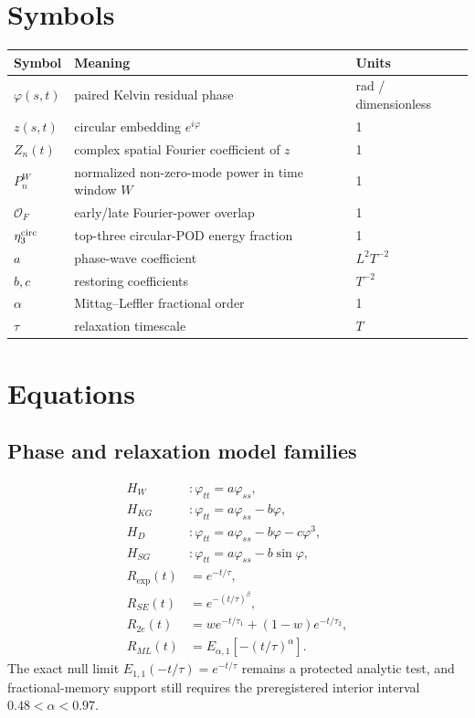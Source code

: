 \documentclass[11pt,a4paper]{article}
\begin{document}
\section{Symbols}
\begin{longtable}{lll}\toprule Symbol & Meaning & Units\\\midrule
$\varphi(s,t)$ & paired Kelvin residual phase & rad / dimensionless\\
$z(s,t)$ & circular embedding $e^{i\varphi}$ & 1\\
$Z_n(t)$ & complex spatial Fourier coefficient of $z$ & 1\\
$P_n^W$ & normalized non-zero-mode power in time window $W$ & 1\\
$\mathcal O_F$ & early/late Fourier-power overlap & 1\\
$\eta_3^{\rm circ}$ & top-three circular-POD energy fraction & 1\\
$a$ & phase-wave coefficient & $L^2T^{-2}$\\
$b,c$ & restoring coefficients & $T^{-2}$\\
$\alpha$ & Mittag--Leffler fractional order & 1\\
$\tau$ & relaxation timescale & $T$\\\bottomrule\end{longtable}

\section{Equations}
\subsection{Phase and relaxation model families}
\begin{align}
H_W &: \varphi_{tt}=a\varphi_{ss},\\
H_{KG} &: \varphi_{tt}=a\varphi_{ss}-b\varphi,\\
H_D &: \varphi_{tt}=a\varphi_{ss}-b\varphi-c\varphi^3,\\
H_{SG} &: \varphi_{tt}=a\varphi_{ss}-b\sin\varphi,\\
R_{\exp}(t)&=e^{-t/\tau},\\
R_{SE}(t)&=e^{-(t/\tau)^\beta},\\
R_{2e}(t)&=w e^{-t/\tau_1}+(1-w)e^{-t/\tau_2},\\
R_{ML}(t)&=E_{\alpha,1}[-(t/\tau)^\alpha].
\end{align}
The exact null limit $E_{1,1}(-t/\tau)=e^{-t/\tau}$ remains a protected analytic test, and fractional-memory support still requires the preregistered interior interval $0.48<\alpha<0.97$.
\end{document}
